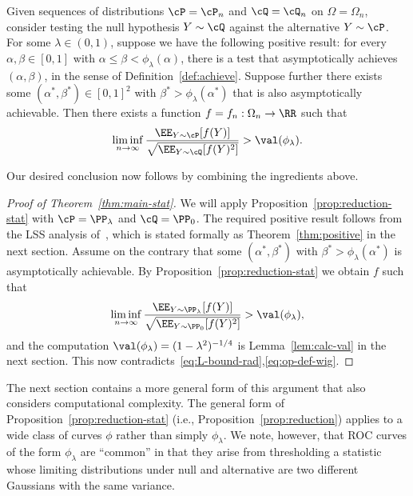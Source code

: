 \documentclass[11pt]{article}
\begin{document}
\begin{proposition}
\label{prop:reduction-stat}
Given sequences of distributions $\cP = \cP_n$ and $\cQ = \cQ_n$ on $\Omega = \Omega_n$, consider testing the null hypothesis $Y \sim \cQ$ against the alternative $Y \sim \cP$. For some $\lambda \in (0,1)$, suppose we have the following positive result: for every $\alpha,\beta \in [0,1]$ with $\alpha \le \beta < \phi_\lambda(\alpha)$, there is a test that asymptotically achieves $(\alpha,\beta)$, in the sense of Definition~\ref{def:achieve}. Suppose further there exists some $(\alpha^*,\beta^*) \in [0,1]^2$ with $\beta^* > \phi_\lambda(\alpha^*)$ that is also asymptotically achievable. Then there exists a function $f = f_n: \Omega_n \to \RR$ such that
\begin{equation}\label{eq:ratio-goal-wig}
\liminf_{n \to \infty} \frac{\EE_{Y \sim \cP}[f(Y)]}{\sqrt{\EE_{Y \sim \cQ}[f(Y)^2]}} > \val(\phi_\lambda).
\end{equation}
\end{proposition}

\noindent Our desired conclusion now follows by combining the ingredients above.

\begin{proof}[Proof of Theorem~\ref{thm:main-stat}]
We will apply Proposition~\ref{prop:reduction-stat} with $\cP = \PP_\lambda$ and $\cQ = \PP_0$. The required positive result follows from the LSS analysis of~\cite{weak-wigner}, which is stated formally as Theorem~\ref{thm:positive} in the next section. Assume on the contrary that some $(\alpha^*,\beta^*)$ with $\beta^* > \phi_\lambda(\alpha^*)$ is asymptotically achievable. By Proposition~\ref{prop:reduction-stat} we obtain $f$ such that
\[ \liminf_{n \to \infty} \frac{\EE_{Y \sim \PP_\lambda}[f(Y)]}{\sqrt{\EE_{Y \sim \PP_0}[f(Y)^2]}} > \val(\phi_\lambda), \]
and the computation $\val(\phi_\lambda) = (1-\lambda^2)^{-1/4}$ is Lemma~\ref{lem:calc-val} in the next section. This now contradicts~\eqref{eq:L-bound-rad},\eqref{eq:op-def-wig}.
\end{proof}

The next section contains a more general form of this argument that also considers computational complexity. The general form of Proposition~\ref{prop:reduction-stat} (i.e., Proposition~\ref{prop:reduction}) applies to a wide class of curves $\phi$ rather than simply $\phi_\lambda$. We note, however, that ROC curves of the form $\phi_\lambda$ are ``common'' in that they arise from thresholding a statistic whose limiting distributions under null and alternative are two different Gaussians with the same variance.
\end{document}

